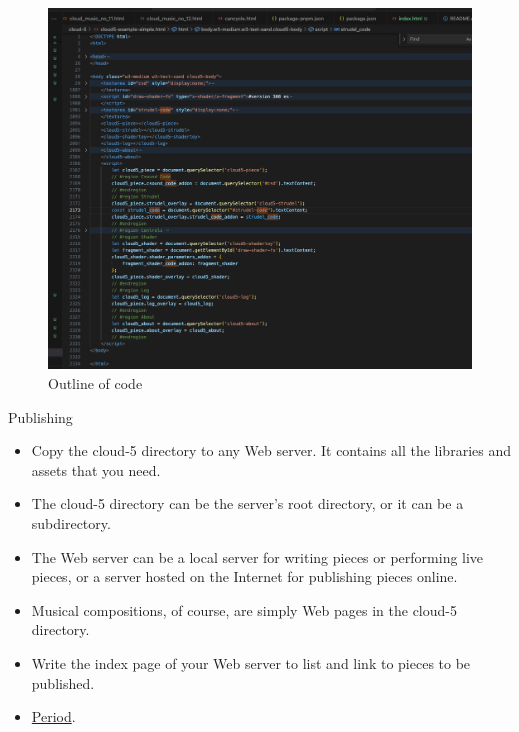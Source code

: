 \documentclass{beamer}
\begin{document}
\begin{frame}{}
\begin{figure}
\centering
\includegraphics[height=0.85\textheight]{cloud5-code}
\caption{Outline of code}
\label{fig:cloud5-code}
\end{figure}
\end{frame}

\begin{frame}{Publishing}
\begin{itemize}
\item Copy the cloud-5 directory to any Web server. It contains all the libraries and assets that you need.
\item The cloud-5 directory can be the server's root directory, or it can be a subdirectory.
\item The Web server can be a local server for writing pieces or performing live pieces, or a server hosted on the Internet for publishing pieces online.
\item Musical compositions, of course, are simply Web pages in the cloud-5 directory.
\item Write the index page of your Web server to list and link to pieces to be published.
\item \href{https://gogins.github.io}{Period}.
\end{itemize}
\end{frame}
\end{document}

